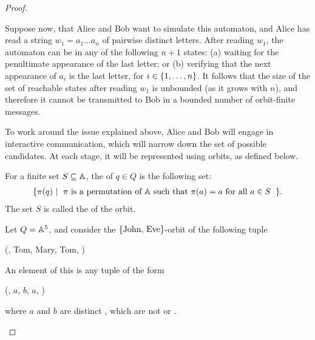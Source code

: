\begin{proof}
\begin{myexample}
Suppose now, that Alice and Bob want to simulate this automaton, and Alice has read a string $w_1 = a_1 \ldots a_n$ of pairwise distinct letters.
After reading $w_1$, the automaton can be in any  of the following $n+1$ states:
(a) waiting for the penultimate appearance of the last letter;
or (b) verifying that the next appearance of $a_i$ is the last letter, for $i \in \{1,\ldots,n\}$.
It follows that the size of the set of reachable states after reading $w_1$ is unbounded (as it grows with $n$),
and therefore it cannot be transmitted to Bob in a bounded number of orbit-finite messages.
\end{myexample}

To work around the issue explained above, Alice and Bob will engage in interactive communication, which will narrow down the set of possible candidates.
At each stage, it will be represented using orbits, as defined below.

\begin{definition}[Orbit] \label{def:orbit}
  \AP
  For a finite set $S \subseteq \mathbb A$, the  of $q \in Q$ is the following set:
    \begin{align*}
    \setbuild{ \pi(q)}{$\pi$ is a permutation of $\atoms$ such that $\pi(a)=a$ for all $a \in S$}.
    \end{align*}
  The set $S$ is called the  of the orbit.
\end{definition}

\begin{myexample}\label{ex:tau-disjoint}
    Let $Q = \mathbb A^5$, and consider the $\{\text{{John}, {Eve}}\}$-orbit of the following tuple
    \begin{center}
        (, Tom, Mary, Tom, )
    \end{center}
    An element of this  is any tuple of the form 
    \begin{center}
        (, $a$, $b$, $a$, )
    \end{center}
    where $a$ and $b$ are distinct , which are not  or . 
\end{myexample}


\end{proof}
